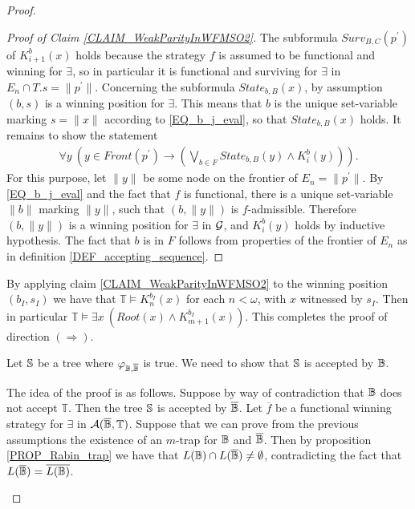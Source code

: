 \begin{proof}
\begin{Iff-RL}
\begin{proof}[Proof of Claim \ref{CLAIM_WeakParityInWFMSO2}]
The subformula ${Surv}_{B,C}(p^{\prime})$ of $K_{i+1}^{b}(x)$ holds because the strategy $f$ is assumed to be functional and winning for $\exists$, so in particular it is functional and surviving for $\exists$ in $E_n \cap T.s = \|p^{\prime}\|$. Concerning the subformula $\mathit{State}_{b,B}(x)$, by assumption $(b,s)$ is a winning position for $\exists$. This means that $b$ is the unique set-variable marking $s = \|x\|$ according to \eqref{EQ_b_j_eval}, so that $\mathit{State}_{b,B}(x)$ holds. It remains to show the statement
\begin{eqnarray}\label{EQ_forallinF_K_m}
  \forall y\ (y\in \mathit{Front}(p^{\prime})\rightarrow (\bigvee_{b \in F} \mathit{State}_{b,B}(y) \wedge K_i^{b}(y))).
\end{eqnarray}
For this purpose, let $\|y\|$ be some node on the frontier of $E_n = \|p^{\prime}\|$. By \eqref{EQ_b_j_eval} and the fact that $f$ is functional, there is a unique set-variable $\|b\|$ marking $\|y\|$, such that $(b,\|y\|)$ is $f$-admissible. Therefore $(b,\|y\|)$ is a winning position for $\exists$ in $\mathcal{G}$, and $K_i^{b}(y)$ holds by inductive hypothesis. The fact that $b$ is in $F$ follows from properties of the frontier of $E_n$ as in definition \ref{DEF_accepting_sequence}.
\end{proof}

By applying claim \ref{CLAIM_WeakParityInWFMSO2} to the winning position $(b_I,s_I)$ we have that $\mathbb{T} \models K_{n}^{b_I}(x)$ for each $n<\omega$, with $x$ witnessed by $s_I$. Then in particular $\mathbb{T} \models \exists x\ (\mathit{Root}(x) \wedge K_{m+1}^{b_I}(x))$. This completes the proof of direction $(\Rightarrow)$.

\end{Iff-RL}
\begin{Iff-LR} Let $\mathbb{S}$ be a tree where $\varphi_{\mathbb{B},\overline{\mathbb{B}}}$ is true. We need to show that $\mathbb{S}$ is accepted by $\mathbb{B}$.

The idea of the proof is as follows. Suppose by way of contradiction that $\mathbb{B}$ does not accept $\mathbb{T}$. Then the tree $\mathbb{S}$ is accepted by $\overline{\mathbb{B}}$. Let $\overline{f}$ be a functional winning strategy for $\exists$ in $\mathcal{A}(\overline{\mathbb{B}},\mathbb{T})$. Suppose that we can prove from the previous assumptions the existence of an $m$-trap for $\mathbb{B}$ and $\overline{\mathbb{B}}$. Then by proposition \ref{PROP_Rabin_trap} we have that $L(\mathbb{B}) \cap L(\overline{\mathbb{B}}) \neq \emptyset$, contradicting the fact that $L(\overline{\mathbb{B}}) = \overline{L(\mathbb{B})}$.


\end{Iff-LR}
\end{proof}
